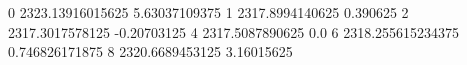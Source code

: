 0 2323.13916015625 5.63037109375
1 2317.8994140625 0.390625
2 2317.3017578125 -0.20703125
4 2317.5087890625 0.0
6 2318.255615234375 0.746826171875
8 2320.6689453125 3.16015625
